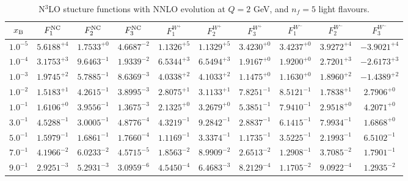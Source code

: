 \begin{table}[h]
\begin{adjustbox}{width=\textwidth}
\begin{tabular}{|c||c|c|c|c|c|c|c|c|c|}
\hline
$x_{\rm B}$ & $F_1^{\rm NC}$ & $F_2^{\rm NC}$ & $F_3^{\rm NC}$ & $F_1^{W^+}$ & $F_2^{W^+}$ & $F_3^{W^+}$ & $F_1^{W^-}$ & $F_2^{W^-}$ & $F_3^{W^-}$ \\
\hline
$ 1.0^{-5}$ & $ 5.6188^{+4}$ & $ 1.7533^{+0}$ & $ 4.6687^{-2}$ & $ 1.1326^{+5}$ & $ 1.1329^{+5}$ & $ 3.4230^{+0}$ & $ 3.4237^{+0}$ & $ 3.9272^{+4}$ & $-3.9021^{+4}$ \\
$ 1.0^{-4}$ & $ 3.1753^{+3}$ & $ 9.6463^{-1}$ & $ 1.9339^{-2}$ & $ 6.5344^{+3}$ & $ 6.5494^{+3}$ & $ 1.9167^{+0}$ & $ 1.9200^{+0}$ & $ 2.7201^{+3}$ & $-2.6173^{+3}$ \\
$ 1.0^{-3}$ & $ 1.9745^{+2}$ & $ 5.7885^{-1}$ & $ 8.6369^{-3}$ & $ 4.0338^{+2}$ & $ 4.1033^{+2}$ & $ 1.1475^{+0}$ & $ 1.1630^{+0}$ & $ 1.8960^{+2}$ & $-1.4389^{+2}$ \\
$ 1.0^{-2}$ & $ 1.5183^{+1}$ & $ 4.2615^{-1}$ & $ 3.8995^{-3}$ & $ 2.8075^{+1}$ & $ 3.1133^{+1}$ & $ 7.8251^{-1}$ & $ 8.5121^{-1}$ & $ 1.7838^{+1}$ & $ 2.7906^{+0}$ \\
$ 1.0^{-1}$ & $ 1.6106^{+0}$ & $ 3.9556^{-1}$ & $ 1.3675^{-3}$ & $ 2.1325^{+0}$ & $ 3.2679^{+0}$ & $ 5.3851^{-1}$ & $ 7.9410^{-1}$ & $ 2.9518^{+0}$ & $ 4.2071^{+0}$ \\
$ 3.0^{-1}$ & $ 4.5288^{-1}$ & $ 3.0005^{-1}$ & $ 4.8776^{-4}$ & $ 4.3219^{-1}$ & $ 9.2842^{-1}$ & $ 2.8837^{-1}$ & $ 6.1415^{-1}$ & $ 7.9934^{-1}$ & $ 1.6868^{+0}$ \\
$ 5.0^{-1}$ & $ 1.5979^{-1}$ & $ 1.6861^{-1}$ & $ 1.7660^{-4}$ & $ 1.1169^{-1}$ & $ 3.3374^{-1}$ & $ 1.1735^{-1}$ & $ 3.5225^{-1}$ & $ 2.1993^{-1}$ & $ 6.5102^{-1}$ \\
$ 7.0^{-1}$ & $ 4.1966^{-2}$ & $ 6.0233^{-2}$ & $ 4.5715^{-5}$ & $ 1.8563^{-2}$ & $ 8.9909^{-2}$ & $ 2.6513^{-2}$ & $ 1.2908^{-1}$ & $ 3.7085^{-2}$ & $ 1.7901^{-1}$ \\
$ 9.0^{-1}$ & $ 2.9251^{-3}$ & $ 5.2931^{-3}$ & $ 3.0959^{-6}$ & $ 4.5450^{-4}$ & $ 6.4683^{-3}$ & $ 8.2129^{-4}$ & $ 1.1705^{-2}$ & $ 9.0922^{-4}$ & $ 1.2935^{-2}$ \\
\hline
\end{tabular}
\end{adjustbox}\caption{N$^{3}$LO stucture functions with NNLO evolution at $Q = 2$ GeV, and $n_f=5$ light flavours.}
\label{tab:N3LO-Q2}
\end{table}


